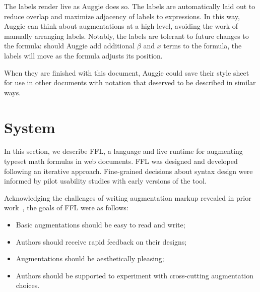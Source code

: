 The labels render live as Auggie does so. The labels are automatically laid out to reduce overlap and maximize adjacency of labels to expressions. In this way, Auggie can think about augmentations at a high level, avoiding the work of manually arranging labels. Notably, the labels are tolerant to future changes to the formula: should Auggie add additional $\beta$ and $x$ terms to the formula, the labels will move as the formula adjusts its position. 

When they are finished with this document, Auggie could save their style sheet for use in other documents with notation that deserved to be described in similar ways.

\section{System}

In this section, we describe FFL, a language and live runtime for augmenting typeset math formulas in web documents. FFL was designed and developed following an iterative approach. Fine-grained decisions about syntax design were informed by pilot usability studies with early versions of the tool.

Acknowledging the challenges of writing augmentation markup revealed in prior work~\cite{ref:head2022math}, the goals of FFL were as follows:

\begin{itemize}
\item Basic augmentations should be easy to read and write;
\item Authors should receive rapid feedback on their designs;
\item Augmentations should be aesthetically pleasing;
\item Authors should be supported to experiment with cross-cutting augmentation choices.
\end{itemize}


